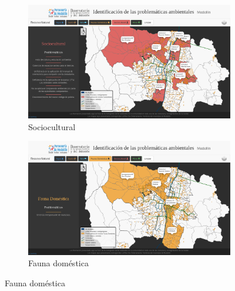 \documentclass[11pt,letterpaper]{article}
\begin{document}
\begin{figure}[hb!]
\begin{subfigure}{.49\textwidth}
	\includegraphics[width=\textwidth]{../assets/images/recurso_natural/recurso_sociocultural.png}
	\caption{Sociocultural}\label{fig:rSociocultural}
\end{subfigure}	
\hfill
\begin{subfigure}{.49\textwidth}
	\includegraphics[width=\textwidth]{../assets/images/recurso_natural/recurso_fauna_domestica.png}
	\caption{Fauna doméstica}\label{fig:rFauna}
\end{subfigure}				


\end{figure}
\end{document}
